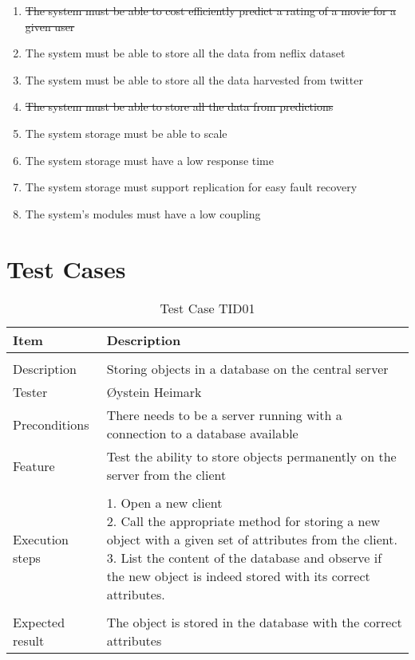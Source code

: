 \begin{enumerate}[label=\bfseries NFR \arabic*:]
  \item {\color{RedOrange}\st{The system must be able to cost efficiently predict a rating of a movie for a given user}}
  \item {\color{OliveGreen}The system must be able to store all the data from neflix dataset}
  \item {\color{OliveGreen}The system must be able to store all the data harvested from twitter}
  \item {\color{RedOrange}\st{The system must be able to store all the data from predictions}}
  \item {\color{OliveGreen}The system storage must be able to scale}
  \item {\color{OliveGreen}The system storage must have a low response time}
  \item {\color{OliveGreen}The system storage must support replication for easy fault recovery}
  \item {\color{OliveGreen}The system's modules must have a low coupling}
\end{enumerate}



\chapter{Test Cases}\label{app:test}
\begin{table}[H]
\caption{Test Case TID01}
\centering
\begin{tabular}{ l p{13cm} }
\hline
 Item            & Description                                                              \\
\hline \\ [-2.0ex]
 Description     & Storing objects in a database on the central server \\
 Tester          & Øystein Heimark                  \\
 Preconditions   & There needs to be a server running with a connection to a database available \\
 Feature         & Test the ability to store objects permanently on the server from the client  \vspace{3pt}   \\
\hline \\ [-1.5ex]
 Execution steps & \pbox{13cm}{1. Open a new client \\ 2. Call the appropriate method for storing a new object with a given set of attributes from the client. \\ 3. List the content of the database and observe if the new object is indeed stored with its correct attributes. } \vspace{3pt} \\
\hline \\ [-1.5ex]
 Expected result & The object is stored in the database with the correct attributes \\
\hline
\end{tabular}
\label{table:testcasetid01}
\end{table}
